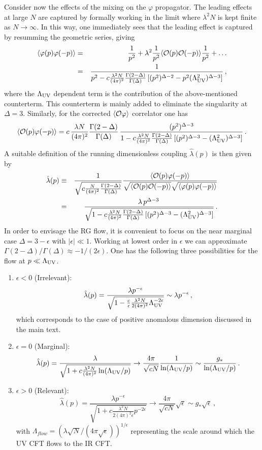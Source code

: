 \documentclass[a4paper,12pt]{article}
\newcommand{\bea}{\begin{eqnarray}}
\newcommand{\eea}{\end{eqnarray}}
\newcommand{\beq}{\begin{equation}}
\newcommand{\eeq}{\end{equation}}
\def\LUV{\Lambda_{\rm UV}}
\def\hlambda{\hat\lambda}
\begin{document}
Consider now the effects of the mixing on the $\varphi$ propagator. The leading effects at large $N$ are captured by  formally working in the limit where $\lambda^2 N$ is kept finite as $N\to \infty$. In this way, one immediately sees that the leading effect is captured by resumming the geometric series, giving
\bea
\langle \varphi(p)\varphi(-p)\rangle &=& \frac{1}{p^2}+\lambda^2 \frac{1}{p^2}\langle {\cal O}(p){\cal O}(-p)\rangle\frac{1}{p^2}+\dots\\&=&\frac{1}{p^2-c\frac{\lambda^2N}{(4\pi)^2}\frac{\Gamma(2-\Delta)}{\Gamma(\Delta)} \left [(p^2)^{\Delta-2}-p^2(\LUV^2)^{\Delta-3}\right ]} \, ,
\eea
where the $\LUV$ dependent term is the contribution of the above-mentioned  counterterm. This counterterm is mainly added to eliminate the singularity  at $\Delta=3$.
Similarly, for the corrected $\langle {\cal O}\varphi\rangle$ correlator one has 
\beq
\langle {\cal{O}}(p)\varphi(-p)\rangle=c\, \frac{\lambda N}{(4\pi)^2}\frac{\Gamma(2-\Delta)}{\Gamma(\Delta)}\,
\frac{(p^2)^{\Delta-3}}{1-c\frac{\lambda^2N}{(4\pi)^2}\frac{\Gamma(2-\Delta)}{\Gamma(\Delta)} \left [(p^2)^{\Delta-3}-(\LUV^2)^{\Delta-3}\right ]} \,.
\eeq
A suitable definition of the running dimensionless coupling $\hlambda(p)$ is then given by
\begin{eqnarray}
\hlambda(p)&\equiv & \frac{1}{\sqrt{c\frac{N}{(4\pi)^2}\frac{\Gamma(2-\Delta)}{\Gamma(\Delta)}}}\frac{\langle {\cal{O}}(p)\varphi(-p)\rangle}{\sqrt{\langle {\cal O}(p){\cal O}(-p)\rangle}\sqrt {\langle \varphi(p)\varphi(-p)\rangle}}\\&=&
\frac{\lambda\,p^{\Delta-3}\,}{\sqrt{1-c\frac{\lambda^2N}{(4\pi)^2}\frac{\Gamma(2-\Delta)}{\Gamma(\Delta)} \left [(p^2)^{\Delta-3}-(\LUV^2)^{\Delta-3}\right ]}}\,.
\end{eqnarray}
In order to envisage the RG flow, it is convenient to focus on the near marginal case $\Delta=3-\epsilon$ with $|\epsilon|\ll 1$. Working at lowest order in $\epsilon$ we can approximate $\Gamma(2-\Delta)/\Gamma(\Delta) \approx -1/(2\epsilon)$. One has the following three possibilities for the flow at $p\ll\LUV$.
\begin{enumerate}
\item $\epsilon<0$ (Irrelevant):
\beq
\hlambda(p)=\frac{\lambda p^{-\epsilon}}{\sqrt{1-\frac{c}{\epsilon}\frac{\lambda^2 N}{2(4\pi)^2}\LUV^{-2\epsilon}}}\sim \lambda p^{-\epsilon} \, ,
\eeq
which corresponds to the case of positive anomalous dimension discussed in the main text.
\item $\epsilon=0$ (Marginal): 
\beq
\hlambda(p)=\frac{\lambda}{\sqrt{1+c\frac{\lambda^2 N}{(4\pi)^2}\ln (\LUV/p)}}\to \frac{4\pi}{\sqrt {cN}}\frac{1}{\ln(\LUV/p)}\sim \frac{g_*}{{\ln(\LUV/p)}}\, .
\eeq
\item $\epsilon>0$ (Relevant):
\beq
\hlambda(p)=\frac{\lambda p^{-\epsilon}}{\sqrt{1+c\frac{\lambda^2 N}{2(4\pi)^2\epsilon}p^{-2\epsilon}}}\to \frac{4\pi}{\sqrt {cN}}\sqrt{\epsilon}\sim g_*\sqrt{\epsilon}\, ,
\eeq
with $\Lambda_{flow}=(\lambda \sqrt{N}/(4\pi \sqrt{\epsilon}))^{1/\epsilon}$ representing the scale around which the UV CFT flows to  the IR CFT.
\end{enumerate}
\end{document}
